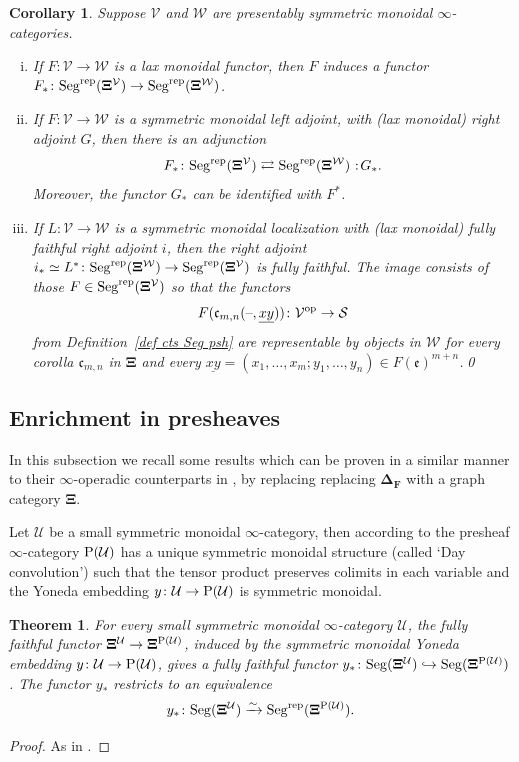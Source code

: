 \documentclass{amsart}
\numberwithin{theorem}{subsection}
\newtheorem{thm}[theorem]{Theorem}
\newtheorem{cor}[theorem]{Corollary}
\theoremstyle{definition}
\providecommand{\op}{\mathrm{op}}
\newcommand{\finsetskel}{\mathbf{F}}
\newcommand{\xS}{\mathcal{S}}
\newcommand{\xU}{\mathcal{U}}
\newcommand{\xV}{\mathcal{V}}
\newcommand{\xW}{\mathcal{W}}
\newcommand{\xfe}{\mathfrak{e}}
\newcommand{\xfc}{\mathfrak{c}}
\newcommand{\Pre}{\name{P}}
\newcommand*\cocolon{%
	\nobreak
	\mskip6mu plus1mu
	\mathpunct{}%
	\nonscript
	\mkern-\thinmuskip
	{:}%
	\mskip2mu
	\relax
}
\newcommand{\icat}{$\infty$-category}
\newcommand{\isoto}{\xrightarrow{\sim}}
\newcommand{\name}[1]{\ensuremath{\text{\textup{#1}}}}
\newcommand{\simp}{\mathbf{\Delta}}
\newcommand{\gc}{\mathbf{\Xi}}
\newcommand{\gcU}{\gc^{\xU}}
\newcommand{\gcPU}{\gc^{\Pre(\xU)}}
\newcommand{\gcV}{\gc^{\xV}}
\newcommand{\Seg}{\name{Seg}}
\newcommand{\blank}{\text{\textendash}}
\newcommand{\Segrep}{\Seg^{\name{rep}}}
\begin{document}
\begin{cor}\label{cor:laxmonftr}
Suppose $\xV$ and $\xW$ are presentably symmetric monoidal $\infty$-categories.
	\begin{enumerate}[(i)]
		\item If $F \colon \xV \to \xW$ is a lax monoidal functor, then $F$ induces a functor $F_{*} \colon \Segrep(\gcV) \to
		\Segrep(\gc^\xW)$.
		\item If $F \colon \xV \to \xW$ is a symmetric monoidal left adjoint, with (lax monoidal) right adjoint $G$, then there is an adjunction
		\[ F_{*} \colon \Segrep(\gcV) \rightleftarrows  \Segrep(\gc^\xW)\cocolon G_{*}.\]
		Moreover, the functor $G_{*}$ can be identified with $F^{*}$.
		\item 
		If $L \colon \xV \to \xW$ is a symmetric monoidal localization with (lax monoidal) fully faithful right adjoint $i$, then the right adjoint $i_{*} \simeq L^{*} \colon \Segrep(\gc^\xW) \to \Segrep(\gcV)$ is fully faithful. 
		The image consists of those $F \in \Segrep(\gcV)$ so that the functors \[ F(\xfc_{m,n}(\blank, \underline{xy}))\colon \xV^\op\to \xS \] from Definition~\ref{def cts Seg psh} are representable by objects in $\xW$ for every corolla $\xfc_{m,n}$ in $\gc$ and every $\underline{xy} = (x_1,\dots,x_m;y_1,\dots,y_n) \in F(\xfe)^{m+n}$.\qed
	\end{enumerate}
\end{cor}

\subsection{Enrichment in presheaves}\label{subsec psh}
In this subsection we recall some results which can be proven in a similar manner to their $\infty$-operadic counterparts in \cite[ and ]{ChuHaugseng}, by replacing replacing $\simp_{\finsetskel}$ with a graph category $\gc$.  

Let $\xU$ be a small symmetric monoidal \icat{}, then according to \cite[Corollary 4.8.1.12]{ha} the presheaf $\infty$-category $\Pre(\xU)$ has a unique symmetric monoidal structure (called `Day convolution') such that the tensor product preserves colimits in each variable and the Yoneda embedding $y\colon \xU \to \Pre(\xU)$ is symmetric monoidal. 


\begin{thm}\label{thm enr psh}
For every small symmetric monoidal \icat{} $\xU$, the fully faithful functor $\gcU \to \gcPU$, induced by the symmetric monoidal Yoneda embedding $y\colon \xU \to \Pre(\xU)$, gives a fully faithful functor $y_{*} \colon \Seg(\gcU) \hookrightarrow \Seg(\gcPU)$.
The functor $y_*$ restricts to an equivalence 
\[ y_*\colon \Seg(\gcU) \isoto \Segrep(\gcPU). \]
\end{thm}
\begin{proof}
	As in \cite[Theorem 2.5.2]{ChuHaugseng}.
\end{proof}
\end{document}
